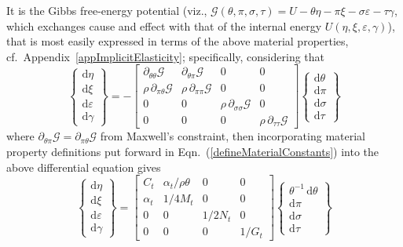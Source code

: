 It is the Gibbs free-energy potential (viz., $\mathcal{G} ( \theta , \pi , \sigma , \tau ) = U - \theta \eta - \pi \xi - \sigma \varepsilon - \tau \gamma$, which exchanges cause and effect with that of the internal energy $U ( \eta , \xi , \varepsilon , \gamma )$), that is most easily expressed in terms of the above material properties, cf.\ Appendix~\ref{appImplicitElasticity}; specifically, considering that
\begin{displaymath}
\left\{ \begin{matrix}
\mathrm{d}\eta \\ \mathrm{d} \xi \\
\mathrm{d} \varepsilon \\ \mathrm{d} \gamma
\end{matrix} \right\} = -\begin{bmatrix}
\partial_{\theta\theta} \mathcal{G} & 
\partial_{\theta\pi} \mathcal{G} & 0 & 0 \\ 
\rho \, \partial_{\pi\theta} \mathcal{G} & 
\rho \, \partial_{\pi\pi} \mathcal{G} & 0 & 0 \\
0 & 0 & \rho \, \partial_{\sigma\sigma} \mathcal{G} & 0 \\
0 & 0 & 0 & \rho \, \partial_{\tau\tau} \mathcal{G}
\end{bmatrix} 
\left\{ \begin{matrix}
\mathrm{d} \theta \\ \mathrm{d} \pi \\
\mathrm{d} \sigma \\ \mathrm{d} \tau
\end{matrix} \right\} 
\end{displaymath}
where $\partial_{\theta\pi} \mathcal{G} = \partial_{\pi\theta} \mathcal{G}$ from Maxwell's constraint, then incorporating material property definitions put forward in Eqn.~(\ref{defineMaterialConstants}) into the above differential equation gives
\begin{displaymath}
\label{GibbsMembrane}
\left\{ \begin{matrix}
\mathrm{d}\eta \\ \mathrm{d} \xi \\
\mathrm{d} \varepsilon \\ \mathrm{d} \gamma
\end{matrix} \right\} = \begin{bmatrix}
C_t & \alpha_t / \rho \theta & 0 & 0 \\ 
\alpha_t & 1 / 4 M_t & 0 & 0 \\
0 & 0 & 1 / 2 N_t & 0 \\
0 & 0 & 0 & 1 / G_t
\end{bmatrix} 
\left\{ \begin{matrix}
\theta^{-1} \, \mathrm{d} \theta \\ \mathrm{d} \pi \\
\mathrm{d} \sigma \\ \mathrm{d} \tau
\end{matrix} \right\} 
\end{displaymath}
